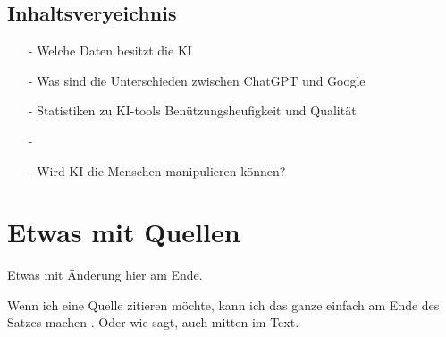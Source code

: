 \documentclass{report}
\begin{document}
\subsection{Inhaltsveryeichnis}

\begin{itemize}
\item[-] Welche Daten besitzt die KI
\item[-] Was sind die Unterschieden zwischen ChatGPT und Google 
\item[-] Statistiken zu KI-tools Benützungsheufigkeit und Qualität
\item[-]  
\item[-] Wird KI die Menschen manipulieren können?

\end{itemize}






\section{Etwas mit Quellen}

Etwas mit Änderung hier am Ende.

Wenn ich eine Quelle zitieren möchte, kann ich das ganze einfach am Ende des Satzes machen \citep{example}. Oder wie \citet{example} sagt, auch mitten im Text.

\printbibliography
\end{document}
